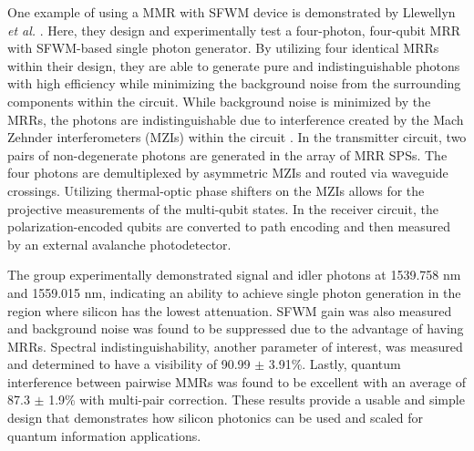 \documentclass[letterpaper, 10 pt, conference]{ieeeconf}  %
\begin{document}
One example of using a MMR with SFWM device is demonstrated by Llewellyn \textit{et al.} \cite{SPS}. Here, they design and experimentally test a four-photon, four-qubit MRR with SFWM-based single photon generator. By utilizing four identical MRRs within their design, they are able to generate pure and indistinguishable photons with high efficiency while minimizing the background noise from the surrounding components within the circuit. While background noise is minimized by the MRRs, the photons are indistinguishable due to interference created by the Mach Zehnder interferometers (MZIs) within the circuit \cite{SPS}. In the transmitter circuit, two pairs of non-degenerate photons are generated in the array of MRR SPSs. The four photons are demultiplexed by asymmetric MZIs and routed via waveguide crossings. Utilizing thermal-optic phase shifters on the MZIs allows for the projective measurements of the multi-qubit states. In the receiver circuit, the polarization-encoded qubits are converted to path encoding and then measured by an external avalanche photodetector.


The group experimentally demonstrated signal and idler photons at 1539.758 nm and 1559.015 nm, indicating an ability to achieve single photon generation in the region where silicon has the lowest attenuation. SFWM gain was also measured and background noise was found to be suppressed due to the advantage of having MRRs. Spectral indistinguishability, another parameter of interest, was measured and determined to have a visibility of 90.99 $\pm$ 3.91\%. Lastly, quantum interference between pairwise MMRs was found to be excellent with an average of 87.3 $\pm$ 1.9\% with multi-pair correction. These results provide a usable and simple design that demonstrates how silicon photonics can be used and scaled for quantum information applications.
\end{document}
